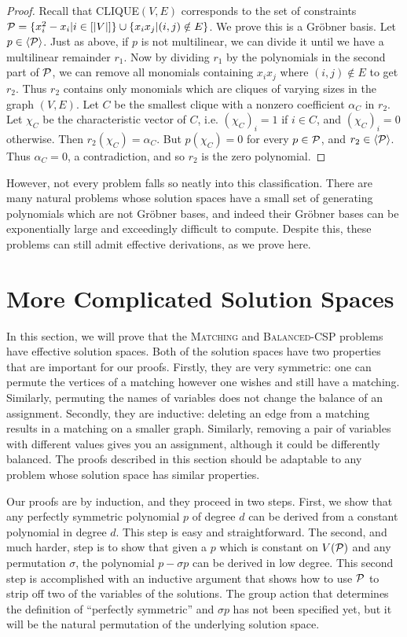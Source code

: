 \begin{proof}
Recall that \textsc{CLIQUE}$(V,E)$ corresponds to the set of constraints $\mathcal P = \{x_i^2 - x_i | i \in [|V|]\} \cup \{ x_ix_j | (i,j) \notin E\}$. 
We prove this is a Gr\"obner basis. Let $p \in \langle \mathcal P \rangle$. Just as above, if $p$ is not multilinear, we can divide it until we have a multilinear
remainder $r_1$. Now by dividing $r_1$ by the polynomials in the second part of $\mathcal P$, we can remove all monomials containing $x_ix_j$ where $(i,j) \notin E$
to get $r_2$. Thus $r_2$ contains only monomials which are cliques of varying sizes in the graph $(V,E)$. Let $C$ be the smallest clique with a
nonzero coefficient $\alpha_C$ in $r_2$. Let $\chi_C$ be the characteristic vector of $C$, i.e. $(\chi_C)_i = 1$ if $i \in C$, and $(\chi_C)_i = 0$ otherwise.
Then $r_2(\chi_C) = \alpha_C$. But $p(\chi_C) = 0$ for every $p \in \mathcal P$, and $r_2 \in \langle \mathcal P \rangle$. Thus $\alpha_C = 0$, a contradiction, and so $r_2$ is the 
zero polynomial.
\end{proof}

However, not every problem falls so neatly into this classification. There are many natural problems whose solution spaces have a small set of generating
polynomials which are not Gr\"obner bases, and indeed their Gr\"obner bases can be exponentially large and exceedingly difficult to compute. Despite this,
these problems can still admit effective derivations, as we prove here.

\section{More Complicated Solution Spaces}
In this section, we will prove that the \textsc{Matching} and \textsc{Balanced-CSP} problems have effective solution spaces. Both of the solution spaces have
two properties that are important for our proofs. Firstly, they are very symmetric: one can permute the vertices of a matching however one wishes and still have a matching. Similarly, permuting the names of variables does not change the balance of an assignment. 
Secondly, they are inductive: deleting an edge from a matching results in a matching on a smaller graph. 
Similarly, removing a pair of variables with different values gives you an assignment, although it could be differently balanced.
The proofs described in this section should be adaptable to any problem whose solution space has similar properties.

Our proofs are by induction, and they proceed in two steps. 
First, we show that any perfectly symmetric polynomial $p$ of degree $d$ can be derived from a constant polynomial in degree $d$.
This step is easy and straightforward. 
The second, and much harder, step is to show that given a $p$ which is constant on $V(\mathcal P)$ and any permutation $\sigma$, the polynomial $p - \sigma p$ can be derived in low degree. 
This second step is accomplished with an inductive argument that shows how to use $\mathcal P$ to strip off two of the variables of the solutions. 
The group action that determines the definition of "`perfectly symmetric"' and $\sigma p$ has not been specified yet, but it will be the natural permutation of the underlying solution space.

